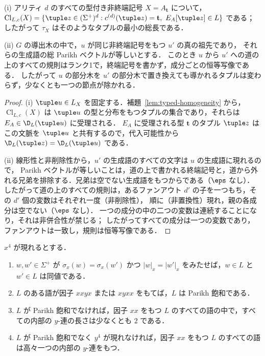 \begin{lemma}\label{lem:app-two-basic}
\textup{(i)} アリティ $d$ のすべての型付き非終端記号 $X=A_{\mathbf t}$ について，
$\operatorname{Cl}_{L,c}(X)=\{\tuple z\in(\Sigma^+)^d:c^{(d)}(\tuple z)=\mathbf t,\
E_A[\tuple z]\in L\}$ である；したがって $\tau_X$ はそのようなタプルの最小の総長である．

\textup{(ii)} $G$ の導出木の中で，$u$ が同じ非終端記号をもつ $u'$ の真の祖先であり，
それらの生成語の総 Parikh ベクトルが等しいとする．
このとき $u$ から $u'$ への道の上のすべての規則はランク1で，終端記号を書かず，成分ごとの恒等写像である．
したがって $u$ の部分木を $u'$ の部分木で置き換えても導かれるタプルは変わらず，少なくとも一つの節点が除かれる．
\end{lemma}

\begin{proof}
(i) $\tuple u\in L_X$ を固定する．補題~\ref{lem:typed-homogeneity} から，
$\operatorname{Cl}_{L,c}(X)$ は $\tuple u$ の型と分布をもつタプルの集合であり，それらは $E_A\in\D_L(\tuple u)$ に受理される．
$E_A$ に受理される型 $\mathbf t$ のタプル $\tuple z$ はこの文脈を $\tuple u$ と共有するので，代入可能性から $\D_L(\tuple z)=\D_L(\tuple u)$ である．

(ii) 線形性と非削除性から，$u'$ の生成語のすべての文字は $u$ の生成語に現れるので，
Parikh ベクトルが等しいことは，道の上で書かれる終端記号と，道から外れる兄弟を排除する．兄弟は空でない生成語をもつからである（$\eps$ なし）．
したがって道の上のすべての規則は，あるファンアウト $d'$ の子を一つもち，その $d'$ 個の変数はそれぞれ一度（非削除性），
順に（非置換性）現れ，親の各成分は空でない（$\eps$ なし）．
一つの成分の中の二つの変数は連続することになり，それは非併合性が禁じる；
したがってすべての成分は一つの変数であり，ファンアウトは一致し，規則は恒等写像である．
\end{proof}

\begin{lemma}[連の交換]\label{lem:app-two-runs}
$x^4$ が現れるとする．
\begin{enumerate}[label=\textup{(\roman*)},leftmargin=*]
\item $w,w'\in\Sigma^+$ が $\sigma_x(w)=\sigma_x(w')$ かつ $|w|_x=|w'|_x$ をみたせば，$w\in L$ と $w'\in L$ は同値である．
\item $L$ のある語が因子 $xxyx$ または $xyxx$ をもてば，$L$ は Parikh 飽和である．
\item $L$ が Parikh 飽和でなければ，因子 $xx$ をもつ $L$ のすべての語の中で，すべての内部の $y$-連の長さは少なくとも $2$ である．
\item $L$ が Parikh 飽和でなく $y^4$ が現れなければ，因子 $xx$ をもつ $L$ のすべての語は高々一つの内部の $y$-連をもつ．
\end{enumerate}
\end{lemma}

